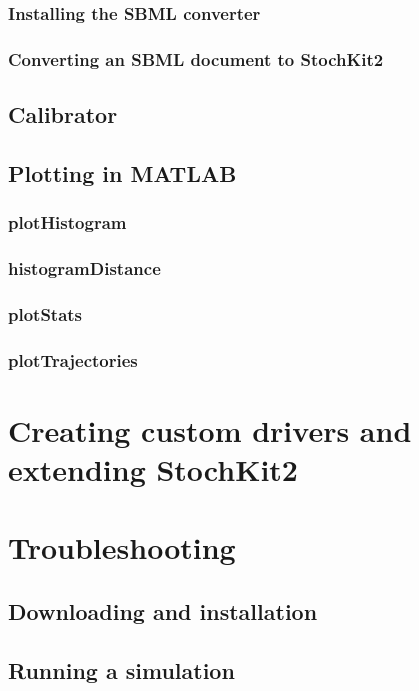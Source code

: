 \documentclass[11pt,letterpaper]{article}
\begin{document}
\subsubsection{Installing the SBML converter}
\subsubsection{Converting an SBML document to StochKit2}
\subsection{Calibrator}
\subsection{Plotting in MATLAB}
\subsubsection{plotHistogram}
\subsubsection{histogramDistance}
\subsubsection{plotStats}
\subsubsection{plotTrajectories}

\section{Creating custom drivers and extending StochKit2}

\section{Troubleshooting}
\subsection{Downloading and installation}
\subsection{Running a simulation}
\end{document}
